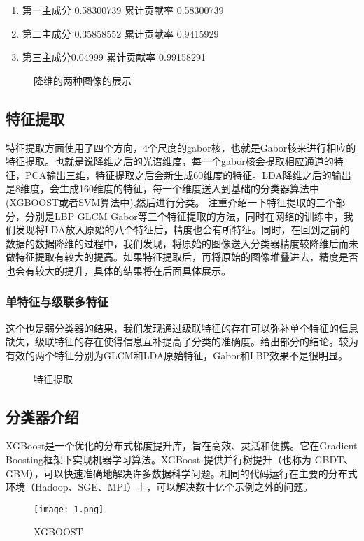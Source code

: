 \documentclass[runningheads]{llncs}
\begin{document}
\begin{enumerate}
    \item 第一主成分 0.58300739 累计贡献率 0.58300739
    \item 第二主成分  0.35858552 累计贡献率 0.9415929
    \item 第三主成分0.04999 累计贡献率 0.99158291
\end{enumerate}
\begin{figure}[t]  %
\centering
{}
\caption{降维的两种图像的展示}
\label{1}
\end{figure}
\subsection{特征提取}
特征提取方面使用了四个方向，4个尺度的gabor核，也就是Gabor核来进行相应的特征提取。也就是说降维之后的光谱维度，每一个gabor核会提取相应通道的特征，PCA输出三维，特征提取之后会新生成60维度的特征。LDA降维之后的输出是8维度，会生成160维度的特征，每一个维度送入到基础的分类器算法中(XGBOOST或者SVM算法中),然后进行分类。
注重介绍一下特征提取的三个部分，分别是LBP GLCM Gabor等三个特征提取的方法，同时在网络的训练中，我们发现将LDA放入原始的八个特征后，精度也会有所特征。同时，在回到之前的数据的数据降维的过程中，我们发现，将原始的图像送入分类器精度较降维后而未做特征提取有较大的提高。如果特征提取后，再将原始的图像堆叠进去，精度是否也会有较大的提升，具体的结果将在后面具体展示。
\subsubsection{单特征与级联多特征}
这个也是弱分类器的结果，我们发现通过级联特征的存在可以弥补单个特征的信息缺失，级联特征的存在使得信息互补提高了分类的准确度。给出部分的结论。较为有效的两个特征分别为GLCM和LDA原始特征，Gabor和LBP效果不是很明显。
\begin{figure}[t]
\centering  %
\caption{特征提取}
\label{1}
\end{figure}

\subsection{分类器介绍}
XGBoost是一个优化的分布式梯度提升库，旨在高效、灵活和便携。它在Gradient Boosting框架下实现机器学习算法。XGBoost 提供并行树提升（也称为 GBDT、GBM），可以快速准确地解决许多数据科学问题。相同的代码运行在主要的分布式环境（Hadoop、SGE、MPI）上，可以解决数十亿个示例之外的问题。
\begin{figure}
    \centering
    \texttt{[image: 1.png]}
    \caption{XGBOOST}
    \label{fig:my_label}
\end{figure}
\end{document}
